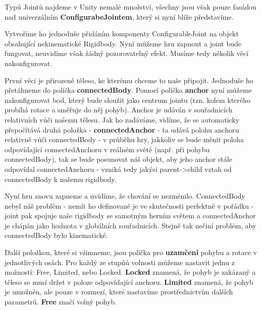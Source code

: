Typů Jointů najdeme v Unity nemalé množství, všechny jsou však pouze fasádou nad univerzálním \textbf{ConfigurabeJointem}, který si nyní blíže představíme.

Vytvoříme ho jednoduše přidáním komponenty ConfigurableJoint na objekt obsahující nekinematické Rigidbody. Nyní můžeme hru zapnout a joint bude fungovat, neuvidíme však žádný pozorovatelný efekt. Musíme tedy několik věcí nakonfigurovat.

První věcí je přirozeně těleso, ke kterému chceme to naše připojit. Jednoduše ho přetáhneme do políčka \textbf{connectedBody}. Pomocí políčka \textbf{anchor} nyní můžeme nakonfigurovat bod, který bude sloužit jako centrum jointu (tzn. kolem kterého probíhá rotace a směřuje do něj pohyb). Anchor je udáván v souřadnicích relativních vůči našemu tělesu. Jak ho zadáváme, vidíme, že se automaticky přepočítává druhá položka - \textbf{connectedAnchor} - ta udává polohu anchoru relativně vůči connectedBody - v průběhu hry, jakkoliv se bude měnit poloha odpovídající connectedAnchoru v reálném světě (např. při pohybu connectedBody), tak se bude posunovat náš objekt, aby jeho anchor stále odpovídal connectedAnchoru - vzniká tedy jakýsi parent->child vztah od connectedBody k našemu rigidbody. 

Nyní hru znovu zapneme a uvidíme, že chování se nezměnilo. ConnectedBody nebyl náš problém - nemít ho definované je ve skutečnosti perfektně v pořádku - joint pak spojuje naše rigidbody se samotným herním světem a connectedAnchor je chápán jako hodnota v globálních souřadnicích. Stejně tak nečiní problém, aby connectedBody bylo kinematické.

Další položkou, které si všimneme, jsou políčka pro \textbf{uzamčení} pohybu a rotace v jednotlivých osách. Pro každý ze stupňů volnosti můžeme nastavit jednu z možností: Free, Limited, nebo Locked. \textbf{Locked} znamená, že pohyb je zakázaný a těleso se musí držet v poloze odpovídající anchoru. \textbf{Limited} znamená, že pohyb je umožněn, ale pouze v rozmezí, které nastavíme prostřednictvím dalších parametrů. \textbf{Free} značí volný pohyb.

